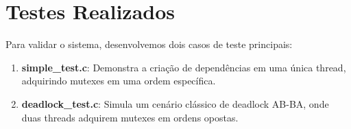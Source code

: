 \section{Testes Realizados}

Para validar o sistema, desenvolvemos dois casos de teste principais:

\begin{enumerate}
    \item \textbf{simple\_test.c}: Demonstra a criação de dependências em uma única thread, adquirindo mutexes em uma ordem específica.
    \item \textbf{deadlock\_test.c}: Simula um cenário clássico de deadlock AB-BA, onde duas threads adquirem mutexes em ordens opostas.
\end{enumerate}
